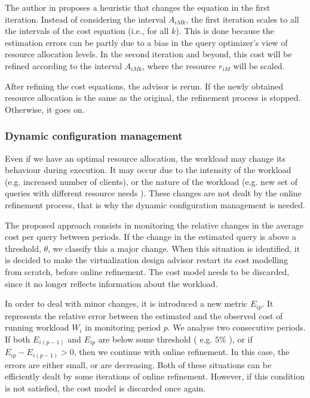 \documentclass[jidm,a4paper]{jidm} %
\begin{document}
The author in \cite{Soror:2008:AVM:1376616.1376711} proposes a heuristic that changes the equation in the first iteration. Instead of  considering the interval $A_{iMk}$, the first iteration scales to all the intervals of the cost equation (i.e., for all $k$). This is done because the estimation errors can be partly due to a bias in the query optimizer's view of resource allocation levels. In the second iteration and beyond, this cost will be refined according to the interval $A_{iMk}$, where the resource $r_{iM}$ will be scaled.


After refining the cost equations, the advisor is rerun. If the newly obtained resource allocation is the same as the original, the refinement process is stopped. Otherwise, it goes on.

\subsubsection{Dynamic configuration management}

\label{subsec:dcm}
Even if we have an optimal resource allocation, the workload may change its behaviour during execution. It may occur due to the intensity of the workload (e.g. increased number of clients), or the nature of the workload (e.g. new set of queries with different resource needs ). These changes are not dealt by the online refinement process, that is why the dynamic configuration management is needed. 

The proposed approach consists in monitoring the relative changes in the average cost per query between periods. If the change in the estimated query is above a threshold, $\theta$, we classify this a major change. When this situation is identified, it is decided to make the virtualization design advisor restart its cost modelling from scratch, before online refinement. The cost model needs to be discarded, since it no longer reflects information about the workload.

In order to deal with minor changes, it is introduced a new metric $E_{ip}$. It represents the relative error between the estimated and the observed cost of running workload $W_{i}$ in monitoring period $p$. We analyse two consecutive periods. If both $E_{i(p-1)}$ and $E_{ip}$ are below some threshold ( e.g. $5\%$ ), or if $E_{ip} - E_{i(p-1)} > 0$, then we continue with online refinement. In this case, the errors are either small, or are decreasing. Both of these situations can be efficiently dealt by some iterations of online refinement. However, if this condition is not satisfied, the cost model is discarded once again. 
\end{document}
